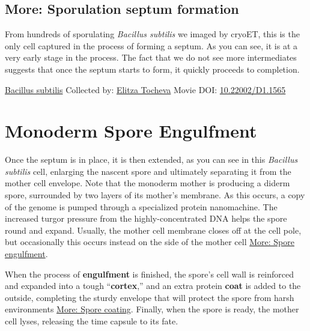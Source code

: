 \documentclass[]{tufte-book}
\begin{document}
\hypertarget{Sporulation_septum_formation}{%
\subsection*{More: Sporulation septum formation}\label{Sporulation_septum_formation}}

From hundreds of sporulating \emph{Bacillus subtilis} we imaged by cryoET, this is the only cell captured in the process of forming a septum. As you can see, it is at a very early stage in the process. The fact that we do not see more intermediates suggests that once the septum starts to form, it quickly proceeds to completion.



\hypertarget{htmlwidget-5ffd876765e9abefcf1e}{}

\label{fig:8-5a}\protect\hyperlink{tree}{Bacillus subtilis} Collected by: \protect\hyperlink{elitza_tocheva}{Elitza Tocheva} Movie DOI: \href{https://doi.org/10.22002/D1.1565}{10.22002/D1.1565}

\hypertarget{monoderm-spore-engulfment}{%
\section{Monoderm Spore Engulfment}\label{monoderm-spore-engulfment}}

Once the septum is in place, it is then extended, as you can see in this \emph{Bacillus subtilis} cell, enlarging the nascent spore and ultimately separating it from the mother cell envelope. Note that the monoderm mother is producing a diderm spore, surrounded by two layers of its mother's membrane. As this occurs, a copy of the genome is pumped through a specialized protein nanomachine. The increased turgor pressure from the highly-concentrated DNA helps the spore round and expand. Usually, the mother cell membrane closes off at the cell pole, but occasionally this occurs instead on the side of the mother cell \protect\hyperlink{Spore_engulfment}{More: Spore engulfment}.

When the process of \textbf{engulfment} is finished, the spore's cell wall is reinforced and expanded into a tough ``\textbf{cortex},'' and an extra protein \textbf{coat} is added to the outside, completing the sturdy envelope that will protect the spore from harsh environments \protect\hyperlink{Spore_coating}{More: Spore coating}. Finally, when the spore is ready, the mother cell lyses, releasing the time capsule to its fate.
\end{document}
